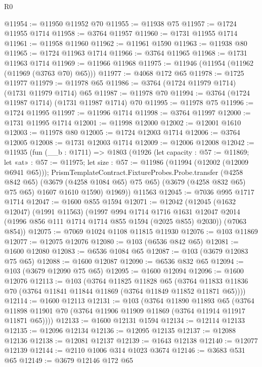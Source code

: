 \begin{lexlean}{R0}
\begin{coremodule}
@11954 := @11950 @11952 @70
@11955 := @11938 @75
@11957 := @1724 @11955 @1714
@11958 := @3764 @11957
@11960 := @1731 @11955 @1714
@11961 := @11958 @11960
@11962 := @11961 @1590
@11963 := @11938 @80
@11965 := @1724 @11963 @1714
@11966 := @3764 @11965
@11968 := @1731 @11963 @1714
@11969 := @11966 @11968
@11975 := @11946 (@11954 (@11962 (@11969 (@3763 @70) @65)))
@11977 := @4068 @172 @65
@11978 := @1725 @11977
@11979 := @11978 @65
@11986 := @3764 (@1724 @11979 @1714) (@1731 @11979 @1714) @65
@11987 := @11978 @70
@11994 := @3764 (@1724 @11987 @1714) (@1731 @11987 @1714) @70
@11995 := @11978 @75
@11996 := @1724 @11995
@11997 := @11996 @1714
@11998 := @3764 @11997
@12000 := @1731 @11995 @1714
@12001 := @11998 @12000
@12002 := @12001 @1610
@12003 := @11978 @80
@12005 := @1724 @12003 @1714
@12006 := @3764 @12005
@12008 := @1731 @12003 @1714
@12009 := @12006 @12008
@12042 := @11935
    (fun (__b : @1711) =>
    @1803
      (@1926
        (let capacity : @57 := @11869;
        let «at» : @57 := @11975;
        let size : @57 := @11986 (@11994 (@12002 (@12009 @6941 @65)));
        PrismTemplateContract.FixtureProbes.Probe.transfer
          (@4258 @842 @65)
          (@3679 (@4258 @1084 @65) @75 @65)
          (@3679 (@4258 @832 @65) @75 @65)
          @1607
          @1610
          @1590)
        @1969))
    @11563
@12045 := @7036 @995 @1717 @1714
@12047 := @1600 @855 @1594
@12071 := @12042
    (@12045
      (@1632 @12047)
      (@1991 @11563)
      (@1997
        @994
        @1714
        @1716
        @1631
        @12047
        @2014
        (@1996 @856 @111 @1714 @1714 @855 @1594 (@2025 @855) @2030))
      (@7063 @854))
@12075 := @7069 @1024 @1108 @11815 @11930
@12076 := @103 @11869
@12077 := @12075 @12076
@12080 := @103 (@6536 @842 @65)
@12081 := @1600 @12080
@12083 := @6536 @1084 @65
@12087 := @103 (@3679 @12083 @75 @65)
@12088 := @1600 @12087
@12090 := @6536 @832 @65
@12094 := @103 (@3679 @12090 @75 @65)
@12095 := @1600 @12094
@12096 := @1600 @12076
@12113 := @103
    (@3764
      @11825
      @11828
      @65
      (@3764 @11833 @11836 @70 (@3764 @11841 @11844 @11869 (@3764 @11849 @11852 @11871 @65))))
@12114 := @1600 @12113
@12131 := @103
    (@3764
      @11890
      @11893
      @65
      (@3764 @11898 @11901 @70 (@3764 @11906 @11909 @11869 (@3764 @11914 @11917 @11871 @65))))
@12133 := @1600 @12131 @1594
@12134 := @12114 @12133
@12135 := @12096 @12134
@12136 := @12095 @12135
@12137 := @12088 @12136
@12138 := @12081 @12137
@12139 := @1643 @12138
@12140 := @12077 @12139
@12144 := @2110 @1006 @314 @1023 @3674
@12146 := @3683 @531 @65
@12149 := @3679 @12146 @172 @65

\end{coremodule}
\end{lexlean}
